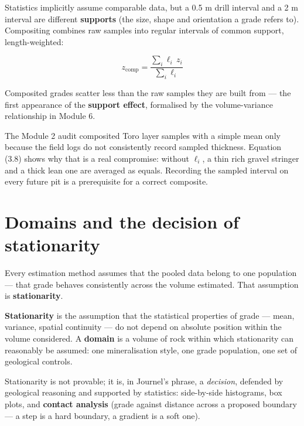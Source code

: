 \documentclass[11pt]{article}
\begin{document}
Statistics implicitly assume comparable data, but a 0.5 m drill interval
and a 2 m interval are different \textbf{supports} (the size, shape and
orientation a grade refers to). Compositing combines raw samples into
regular intervals of common support, length-weighted:

\begin{eqbox}
\[ z_{\text{comp}} = \frac{\sum_{i} \ell_i\, z_i}{\sum_{i} \ell_i}
   \tag{3.8}\]
\end{eqbox}

Composited grades scatter less than the raw samples they are built from
--- the first appearance of the \textbf{support effect}, formalised by
the volume-variance relationship in Module 6.

\begin{torobox}
The Module 2 audit composited Toro layer samples with a simple mean only
because the field logs do not consistently record sampled thickness. Equation
(3.8) shows why that is a real compromise: without $\ell_i$, a thin rich
gravel stringer and a thick lean one are averaged as equals. Recording
the sampled interval on every future pit is a prerequisite for a correct
composite.
\end{torobox}

\section{Domains and the decision of stationarity}

Every estimation method assumes that the pooled data belong to one
population --- that grade behaves consistently across the volume estimated.
That assumption is \textbf{stationarity}.

\begin{defbox}
\textbf{Stationarity} is the assumption that the statistical properties
of grade --- mean, variance, spatial continuity --- do not depend on
absolute position within the volume considered. A \textbf{domain} is a
volume of rock within which stationarity can reasonably be assumed: one
mineralisation style, one grade population, one set of geological
controls.
\end{defbox}

Stationarity is not provable; it is, in Journel's phrase, a
\emph{decision}, defended by geological reasoning and supported by
statistics: side-by-side histograms, box plots, and \textbf{contact
analysis} (grade against distance across a proposed boundary --- a step
is a hard boundary, a gradient is a soft one).
\end{document}
